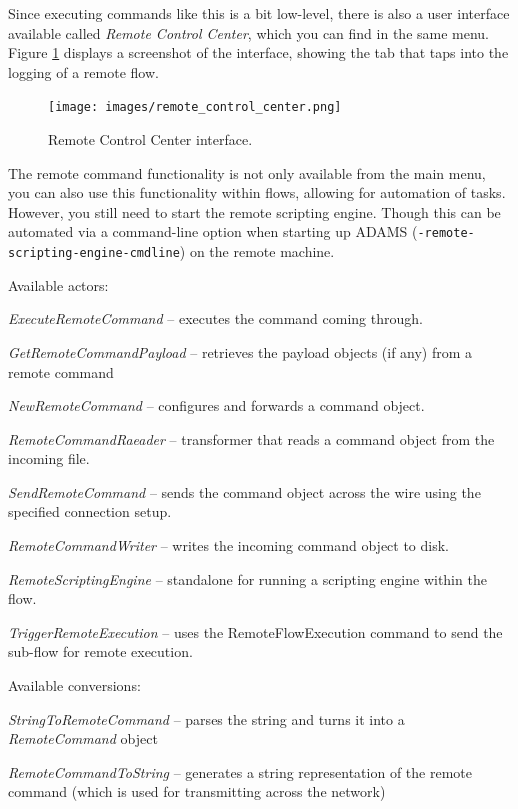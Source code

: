 Since executing commands like this is a bit low-level, there is also a
user interface available called \textit{Remote Control Center}, which you
can find in the same menu. Figure \ref{remote_control_center} displays a screenshot
of the interface, showing the tab that taps into the logging of a remote flow.

\begin{figure}[htb]
  \centering
  \texttt{[image: images/remote\_control\_center.png]}
  \caption{Remote Control Center interface.}
  \label{remote_control_center}
\end{figure}

The remote command functionality is not only available from the main menu,
you can also use this functionality within flows, allowing for automation
of tasks. However, you still need to start the remote scripting engine. Though
this can be automated via a command-line option when starting up ADAMS
(\texttt{-remote-scripting-engine-cmdline}) on the remote machine.

Available actors:
\begin{tight_itemize}
  \item \textit{ExecuteRemoteCommand} -- executes the command coming through.
  \item \textit{GetRemoteCommandPayload} -- retrieves the payload objects (if
  any) from a remote command
  \item \textit{NewRemoteCommand} -- configures and forwards a command object.
  \item \textit{RemoteCommandRaeader} -- transformer that reads a command
  object from the incoming file.
  \item \textit{SendRemoteCommand} -- sends the command object across the wire
  using the specified connection setup.
  \item \textit{RemoteCommandWriter} -- writes the incoming command object to disk.
  \item \textit{RemoteScriptingEngine} -- standalone for running a scripting
  engine within the flow.
  \item \textit{TriggerRemoteExecution} -- uses the RemoteFlowExecution command
  to send the sub-flow for remote execution.
\end{tight_itemize}

Available conversions:
\begin{tight_itemize}
  \item \textit{StringToRemoteCommand} -- parses the string and turns it into
  a \textit{RemoteCommand} object
  \item \textit{RemoteCommandToString} -- generates a string representation of
  the remote command (which is used for transmitting across the network)
\end{tight_itemize}

